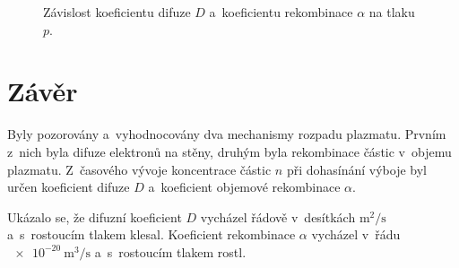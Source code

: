 \documentclass{protokol}
\newcommand\dens{n}
\newcommand\densinit{n_0}
\newcommand\pres{p}
\newcommand\diffuse{D}
\newcommand\diffuseunit{\metre\squared\per\second}
\newcommand\recomb{\alpha}
\newcommand\recombunit{\metre\cubed\per\second}
\begin{document}
\begin{figure}[htp]
	\centering
	
	
	\caption{Závislost koeficientu difuze $\diffuse$
		a~koeficientu rekombinace $\recomb$ na tlaku $\pres$.}
	\label{fig:diffuse-recomb-pres}
\end{figure}

% 	

\section{Závěr}
Byly pozorovány a~vyhodnocovány dva mechanismy rozpadu plazmatu.
Prvním z~nich byla difuze elektronů na stěny,
druhým byla rekombinace částic v~objemu plazmatu.
Z~časového vývoje koncentrace částic $\dens$ při dohasínání výboje
byl určen koeficient difuze $\diffuse$
a~koeficient objemové rekombinace $\recomb$.

Ukázalo se, že difuzní koeficient $\diffuse$ vycházel řádově
v~desítkách $\si{\diffuseunit}$ a~s~rostoucím tlakem klesal.
Koeficient rekombinace $\recomb$ vycházel v~řádu $\SI{e-20}{\recombunit}$
a~s~rostoucím tlakem rostl.
\end{document}
